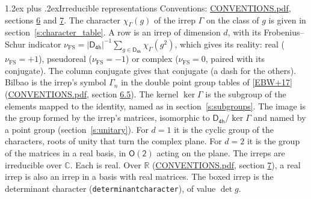 \documentclass[10pt,a4paper]{article}
\makeatletter
\renewcommand\section{\@startsection{section}{1}{\z@}{-3ex plus -1ex minus -.2ex}%
  {1.2ex plus .2ex}{\normalfont\large\sffamily\bfseries\color{parttitle}}}
\numberwithin{equation}{section}
\newcommand{\grp}[1]{\mathsf{#1}}
\newcommand{\irchar}[1]{\chi_{#1}}
\newcommand{\fsind}{\nu_{\mathrm{FS}}}
\makeatother
\begin{document}
\section{Irreducible representations}\label{s:irreps}
Conventions: \href{../../CONVENTIONS.pdf}{CONVENTIONS.pdf}, sections \href{../../CONVENTIONS.pdf\#conv.6}{6} and \href{../../CONVENTIONS.pdf\#conv.7}{7}.
\leavevmode\label{n:function.character}\label{n:irrep.Gamma}The character $\irchar{\Gamma}(g)$ of the irrep $\Gamma$ on the class of $g$ is given in section~\ref{s:character_table}.
\leavevmode\label{n:index.dimension}\label{n:index.frobenius}\label{n:head.irrep}\label{n:head.reality}A row is an irrep of dimension $d$, with its Frobenius--Schur indicator $\fsind = |\grp{D_{4h}}|^{-1}\allowbreak\sum_{g\in\grp{D_{4h}}}\irchar{\Gamma}(g^2)$, which gives its reality: real ($\fsind = +1$), pseudoreal ($\fsind = -1$) or complex ($\fsind = 0$, paired with its conjugate). \label{n:head.conjugate}The column conjugate gives that conjugate (a dash for the others). \label{n:head.bilbao}\label{n:irrep.alias.gamma}Bilbao is the irrep's symbol $\Gamma_n$ in the double point group tables of [\href{../../../REFERENCES.pdf\#ref.EBW+17}{EBW+17}] (\href{../../CONVENTIONS.pdf}{CONVENTIONS.pdf}, section \href{../../CONVENTIONS.pdf\#conv.6.5}{6.5}). \label{n:head.kernel}The kernel $\ker\Gamma$ is the subgroup of the elements mapped to the identity, named as in section~\ref{s:subgroups}. \label{n:head.image}The image is the group formed by the irrep's matrices, isomorphic to $\grp{D_{4h}}/\ker\Gamma$ and named by a point group (section~\ref{s:unitary}). For $d = 1$ it is the cyclic group of the characters, roots of unity that turn the complex plane. For $d = 2$ it is the group of the matrices in a real basis, in $\grp{O(2)}$ acting on the plane. The irreps are irreducible over $\mathbb{C}$. Each is real. Over $\mathbb{R}$ (\href{../../CONVENTIONS.pdf}{CONVENTIONS.pdf}, section \href{../../CONVENTIONS.pdf\#conv.7}{7}), a real irrep is also an irrep in a basis with real matrices. \label{n:mark.determinant}The boxed irrep is the determinant character (\texttt{determinantcharacter}), of value $\det g$.
\setlength{\emergencystretch}{2em}\par\setlength{\emergencystretch}{0pt}
\end{document}
